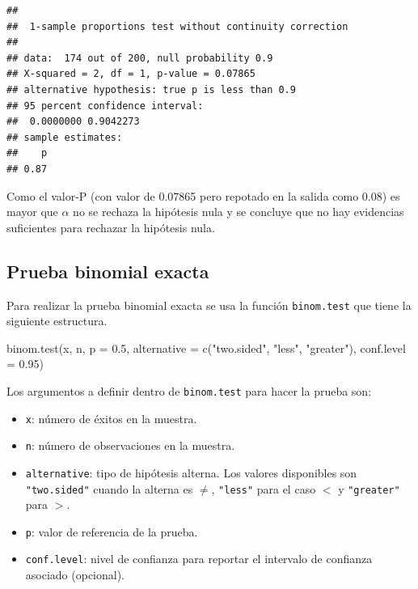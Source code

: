 \documentclass[
]{book}
\makeatletter
\newenvironment{Shaded}{\begin{snugshade}}{\end{snugshade}}
\newcommand{\AttributeTok}[1]{\textcolor[rgb]{0.77,0.63,0.00}{#1}}
\newcommand{\FloatTok}[1]{\textcolor[rgb]{0.00,0.00,0.81}{#1}}
\newcommand{\FunctionTok}[1]{\textcolor[rgb]{0.00,0.00,0.00}{#1}}
\newcommand{\NormalTok}[1]{#1}
\newcommand{\StringTok}[1]{\textcolor[rgb]{0.31,0.60,0.02}{#1}}
\providecommand{\tightlist}{%
  \setlength{\itemsep}{0pt}\setlength{\parskip}{0pt}}
\newenvironment{kframe}{%
\medskip{}
\setlength{\fboxsep}{.8em}
 \def\at@end@of@kframe{}%
 \ifinner\ifhmode%
  \def\at@end@of@kframe{\end{minipage}}%
  \begin{minipage}{\columnwidth}%
 \fi\fi%
 \def\FrameCommand##1{\hskip\@totalleftmargin \hskip-\fboxsep
 \colorbox{shadecolor}{##1}\hskip-\fboxsep
     \hskip-\linewidth \hskip-\@totalleftmargin \hskip\columnwidth}%
 \MakeFramed {\advance\hsize-\width
   \@totalleftmargin\z@ \linewidth\hsize
   \@setminipage}}%
 {\par\unskip\endMakeFramed%
 \at@end@of@kframe}
\renewenvironment{Shaded}{\begin{kframe}}{\end{kframe}}
\makeatother
\begin{document}
\begin{verbatim}
## 
##  1-sample proportions test without continuity correction
## 
## data:  174 out of 200, null probability 0.9
## X-squared = 2, df = 1, p-value = 0.07865
## alternative hypothesis: true p is less than 0.9
## 95 percent confidence interval:
##  0.0000000 0.9042273
## sample estimates:
##    p 
## 0.87
\end{verbatim}

Como el valor-P (con valor de 0.07865 pero repotado en la salida como 0.08) es mayor que \(\alpha\) no se rechaza la hipótesis nula y se concluye que no hay evidencias suficientes para rechazar la hipótesis nula.

\hypertarget{prueba-binomial-exacta}{%
\subsection{Prueba binomial exacta}\label{prueba-binomial-exacta}}

Para realizar la prueba binomial exacta se usa la función \texttt{binom.test} que tiene la siguiente estructura.

\begin{Shaded}
\begin{Highlighting}[]
\FunctionTok{binom.test}\NormalTok{(x, n, }\AttributeTok{p =} \FloatTok{0.5}\NormalTok{,}
           \AttributeTok{alternative =} \FunctionTok{c}\NormalTok{(}\StringTok{"two.sided"}\NormalTok{, }\StringTok{"less"}\NormalTok{, }\StringTok{"greater"}\NormalTok{),}
           \AttributeTok{conf.level =} \FloatTok{0.95}\NormalTok{)}
\end{Highlighting}
\end{Shaded}

Los argumentos a definir dentro de \texttt{binom.test} para hacer la prueba son:

\begin{itemize}
\tightlist
\item
  \texttt{x}: número de éxitos en la muestra.
\item
  \texttt{n}: número de observaciones en la muestra.
\item
  \texttt{alternative}: tipo de hipótesis alterna. Los valores disponibles son \texttt{"two.sided"} cuando la alterna es \(\neq\), \texttt{"less"} para el caso \(<\) y \texttt{"greater"} para \(>\).
\item
  \texttt{p}: valor de referencia de la prueba.
\item
  \texttt{conf.level}: nivel de confianza para reportar el intervalo de confianza asociado (opcional).
\end{itemize}
\end{document}
